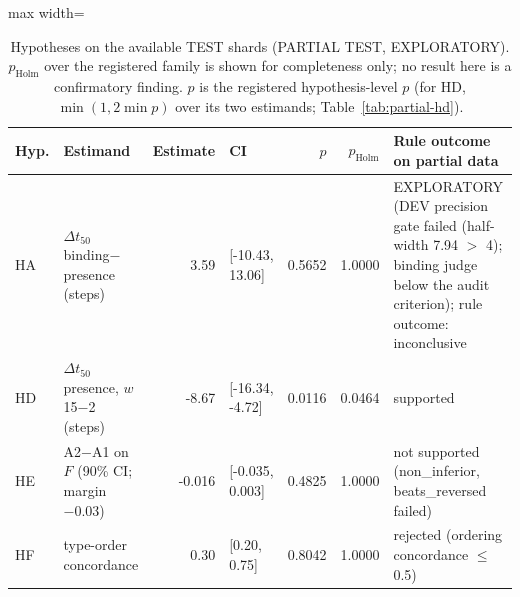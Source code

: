 \begin{table}[t]\centering\small
\caption{Hypotheses on the available TEST shards (PARTIAL TEST, EXPLORATORY). $p_{\mathrm{Holm}}$ over the registered family is shown for completeness only; no result here is a confirmatory finding. $p$ is the registered hypothesis-level $p$ (for HD, $\min(1, 2\min p)$ over its two estimands; Table~\ref{tab:partial-hd}).}\label{tab:partial-hyp}
\begin{adjustbox}{max width=\linewidth}
\begin{tabular}{llrlrrp{4.2cm}}
\toprule
Hyp. & Estimand & Estimate & CI & $p$ & $p_{\mathrm{Holm}}$ & Rule outcome on partial data \\
\midrule
HA & $\Delta t_{50}$ binding$-$presence (steps) & 3.59 & [-10.43, 13.06] & 0.5652 & 1.0000 & EXPLORATORY (DEV precision gate failed (half-width 7.94 $>$ 4); binding judge below the audit criterion); rule outcome: inconclusive \\
HD & $\Delta t_{50}$ presence, $w$15$-$2 (steps) & -8.67 & [-16.34, -4.72] & 0.0116 & 0.0464 & supported \\
HE & A2$-$A1 on $F$ (90\% CI; margin $-0.03$) & -0.016 & [-0.035, 0.003] & 0.4825 & 1.0000 & not supported (non\_inferior, beats\_reversed failed) \\
HF & type-order concordance & 0.30 & [0.20, 0.75] & 0.8042 & 1.0000 & rejected (ordering concordance $\le$ 0.5) \\
\bottomrule
\end{tabular}
\end{adjustbox}
\end{table}
